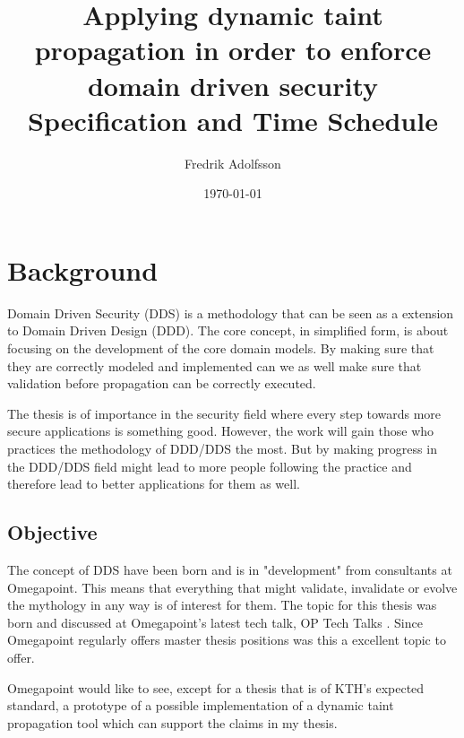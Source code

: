 \documentclass{../kththesis}
\title{Applying dynamic taint propagation in order to enforce domain driven security \\
        \large Specification and Time Schedule}
\author{Fredrik Adolfsson}
\date{\today}
\begin{document}
\frontmatter


\titlepage


\tableofcontents


\mainmatter



\chapter{Background}
Domain Driven Security (DDS) is a methodology that can be seen as a extension to Domain Driven Design (DDD). The core concept, in simplified form, is about focusing on the development of the core domain models. By making sure that they are correctly modeled and implemented can we as well make sure that validation before propagation can be correctly executed. \parencite{evans_2015, EvansEric2004Dd:t, Wilander2009, Johnsson2009}

The thesis is of importance in the security field where every step towards more secure applications is something good. However, the work will gain those who practices the methodology of DDD/DDS the most. But by making progress in the DDD/DDS field might lead to more people following the practice and therefore lead to better applications for them as well.


\section{Objective}
The concept of DDS have been born and is in "development" from consultants at Omegapoint. This means that everything that might validate, invalidate or evolve the mythology in any way is of interest for them. The topic for this thesis was born and discussed at Omegapoint's latest tech talk, OP Tech Talks \parencite{Tardell}. Since Omegapoint regularly offers master thesis positions was this a excellent topic to offer.

Omegapoint would like to see, except for a thesis that is of KTH's expected standard, a prototype of a possible implementation of a dynamic taint propagation tool which can support the claims in my thesis.
\end{document}
